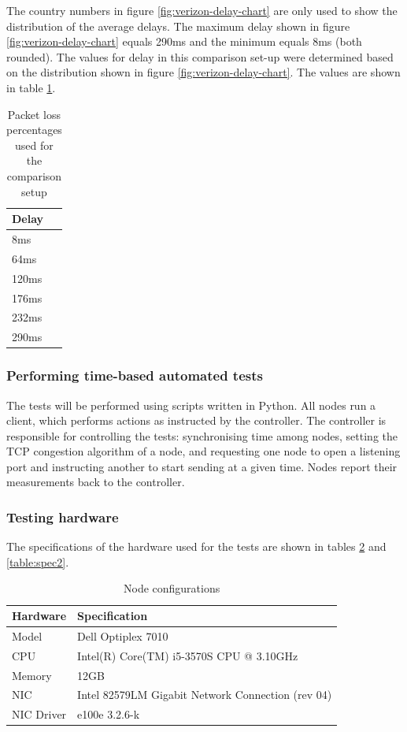 \documentclass{article}
\begin{document}
The country numbers in figure \ref{fig:verizon-delay-chart} are only used to
show the distribution of the average delays. The maximum delay shown in figure
\ref{fig:verizon-delay-chart} equals 290ms and the minimum equals 8ms (both
rounded). The values for delay in this comparison set-up were determined based
on the distribution shown in figure \ref{fig:verizon-delay-chart}. The values
are shown in table \ref{table:test-delay}.

\begin{table}[H]
	\centering
	\begin{tabular}[H]{ | l |}
	\hline
	\textbf{Delay} \\
	\hline  8ms\\
	\hline  64ms  \\
	\hline  120ms  \\
	\hline  176ms \\
	\hline	232ms \\
	\hline  290ms  \\
	\hline
	\end{tabular}
	\caption{Packet loss percentages used for the comparison setup}
	\label{table:test-delay}
\end{table}


\subsubsection{Performing time-based automated tests}

The tests will be performed using scripts written in Python\cite{git-lsproj}.
All nodes run a client, which performs actions as instructed by the controller.
The controller is responsible for controlling the tests: synchronising time
among nodes, setting the TCP congestion algorithm of a node, and requesting one
node to open a listening port and instructing another to start sending at a
given time. Nodes report their measurements back to the controller.

\subsubsection{Testing hardware}

The specifications of the hardware used for the tests are shown in tables \ref{table:spec1} and \ref{table:spec2}.

\begin{table}[H]
	\centering
	\caption{Node configurations}
	\begin{tabular}[H]{ | l | l | }
	\hline
	\textbf{Hardware} & \textbf{Specification} \\
	\hline  Model & Dell Optiplex 7010\\
	\hline  CPU & Intel(R) Core(TM) i5-3570S CPU @ 3.10GHz\\
	\hline  Memory & 12GB\\
	\hline  NIC & Intel 82579LM Gigabit Network Connection (rev 04)\\
	\hline	NIC Driver & e100e 3.2.6-k\\
	\hline
	\end{tabular}
	\label{table:spec1}
\end{table}
\end{document}
